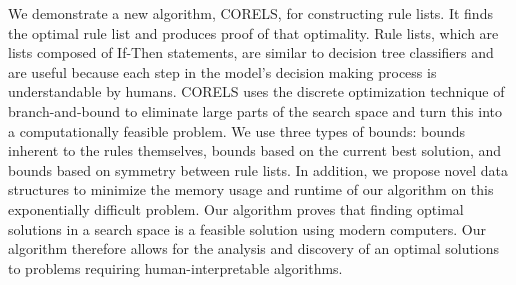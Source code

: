 
We demonstrate a new algorithm, CORELS, for constructing rule lists. It finds the optimal rule list and produces proof of that optimality. Rule lists, which are lists composed of If-Then statements, are similar to decision tree classifiers and are useful because each step in the model's decision making process is understandable by humans. CORELS uses the discrete optimization technique of branch-and-bound to eliminate large parts of the search space and turn this into a computationally feasible problem. We use three types of bounds: bounds inherent to the rules themselves, bounds based on the current best solution, and bounds based on symmetry between rule lists. In addition, we propose novel data structures to minimize the memory usage and runtime of our algorithm on this exponentially difficult problem. Our algorithm proves that finding optimal solutions in a search space is a feasible solution using modern computers. Our algorithm therefore allows for the analysis and discovery of an optimal solutions to problems requiring human-interpretable algorithms.